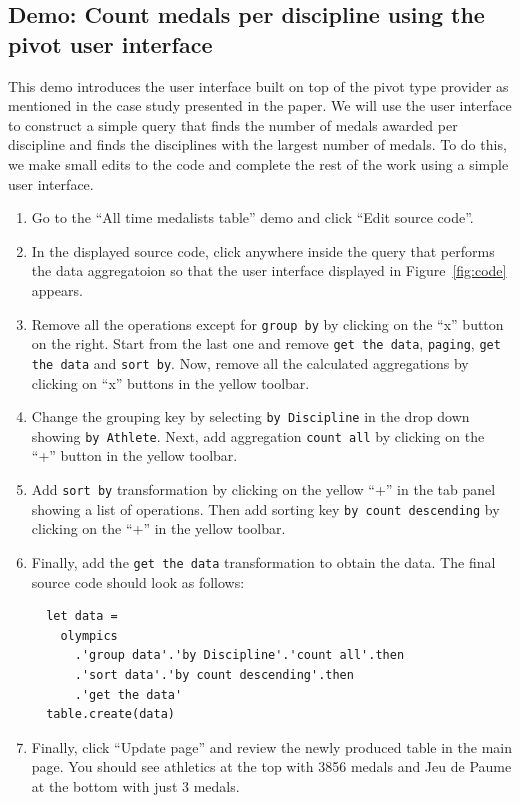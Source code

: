 \documentclass[a4paper,UKenglish]{lipics-v2016}
\theoremstyle{plain}
\theoremstyle{definition}
\begin{document}
\subsection{Demo: Count medals per discipline using the pivot user interface}

This demo introduces the user interface built on top of the pivot type provider as mentioned in the
case study presented in the paper. We will use the user interface to construct a simple query that
finds the number of medals awarded per discipline and finds the disciplines with the largest number
of medals. To do this, we make small edits to the code and complete the rest of the work using
a simple user interface.

\begin{enumerate}
\item Go to the ``All time medalists table'' demo and click ``Edit source code''.
\item In the displayed source code, click anywhere inside the query that performs the data aggregatoion
  so that the user interface displayed in Figure~\ref{fig:code} appears.
\item Remove all the operations except for \texttt{group by} by clicking on the ``x'' button on 
  the right. Start from the last one and remove \texttt{get the data}, \texttt{paging},
  \texttt{get the data} and \texttt{sort by}. Now, remove all the calculated aggregations 
  by clicking on ``x'' buttons in the yellow toolbar. 
\item Change the grouping key by selecting \texttt{by Discipline} in the drop down
  showing \texttt{by Athlete}. Next, add aggregation \texttt{count all} by clicking on the 
  ``+'' button in the yellow toolbar.
\item Add \texttt{sort by} transformation by clicking on the yellow ``+'' in the tab panel showing
  a list of operations. Then add sorting key \texttt{by count descending} by clicking on the ``+''
  in the yellow toolbar.    
\item Finally, add the \texttt{get the data} transformation to obtain the data. The final source
  code should look as follows:
\begin{verbatim}
  let data =
    olympics
      .'group data'.'by Discipline'.'count all'.then
      .'sort data'.'by count descending'.then
      .'get the data'
  table.create(data)  
\end{verbatim}
\item Finally, click ``Update page'' and review the newly produced table in the main page. You should
  see athletics at the top with 3856 medals and Jeu de Paume at the bottom with just 3 medals.
\end{enumerate}
\end{document}

